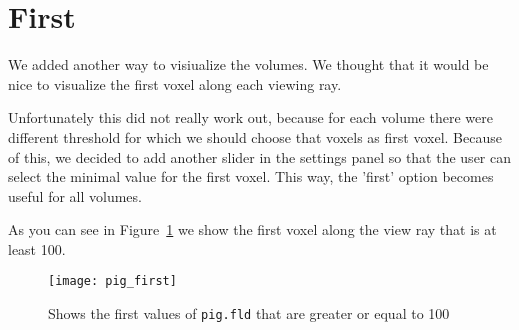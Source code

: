 \section{First}\label{Sec:First}

We added another way to visiualize the volumes.
We thought that it would be nice to visualize the first voxel along each viewing ray.

Unfortunately this did not really work out, because for each volume there were different threshold for which we should choose that voxels as first voxel.
Because of this, we decided to add another slider in the settings panel so that the user can select the minimal value for the first voxel.
This way, the 'first' option becomes useful for all volumes.

As you can see in Figure~\ref{fig:first} we show the first voxel along the view ray that is at least 100.

\begin{figure}[H]
	\centering
		\texttt{[image: pig\_first]}
		\caption{Shows the first values of \texttt{pig.fld} that are greater or equal to 100}
	\label{fig:first}
\end{figure}
